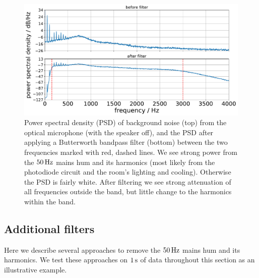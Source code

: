 \documentclass[paper-main.tex]{subfiles}
\begin{document}
\begin{figure}
	\includegraphics[width=.49\textwidth]{figures/psd_butterworth_14_6.pdf}
	\caption{\label{fig:psd_noise}
Power spectral density (PSD) of background noise (top) from the optical microphone (with the speaker off), and the PSD after applying a Butterworth bandpass filter (bottom) between the two frequencies marked with red, dashed lines. 
We see strong power from the $50\,{\rm Hz}$ mains hum and its harmonics (most likely from the photodiode circuit and the room’s lighting and cooling). Otherwise the PSD is fairly white. 
After filtering we see strong attenuation of all frequencies outside the band, but little change to the harmonics within the band.
}
\end{figure}


\subsection{Additional filters}
\label{sec:simple_filters}

Here we describe several approaches to remove the $50\,{\rm Hz}$ mains hum and its harmonics. 
We test these approaches on $1\,{\rm s}$ of data throughout this section as an illustrative example. 
\end{document}
